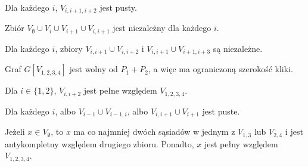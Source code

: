 \documentclass[polish]{beamer}
\begin{document}
\begin{frame}
    \begin{theorem}
        \renewcommand{\qedsymbol}{}
        Dla każdego $i$, $V_{i,i+1,i+2}$ jest pusty.
    \end{theorem}
    \graphSmaller
\end{frame}

\begin{frame}
    \begin{theorem}
        \renewcommand{\qedsymbol}{}
        Zbiór $V_\emptyset \cup V_i \cup V_{i+1} \cup V_{i,i+1}$ jest niezależny dla każdego $i$.
    \end{theorem}
    \graphSmaller
\end{frame}

\begin{frame}
    \begin{theorem}
        \renewcommand{\qedsymbol}{}
        Dla każdego $i$, zbiory $V_{i,i+1} \cup V_{i,i+2}$ i $V_{i,i+1} \cup V_{i+1,i+3}$ są niezależne.
    \end{theorem}
    \graphSmaller
\end{frame}

\begin{frame}
    \begin{theorem}
        \renewcommand{\qedsymbol}{}
        Graf $G[V_{1,2,3,4}]$ jest wolny od $P_1 + P_2$, a więc ma ograniczoną szerokość kliki.
        \end{theorem}
    \graphSmaller
\end{frame}

\begin{frame}
    \begin{theorem}
        \renewcommand{\qedsymbol}{}
        Dla $i \in \{1,2\}$, $V_{i,i+2}$ jest pełne względem $V_{1,2,3,4}$.
    \end{theorem}
    \graphSmaller
\end{frame}

\begin{frame}
    \begin{theorem}
        \renewcommand{\qedsymbol}{}
        Dla każdego $i$, albo $V_{i-1} \cup V_{i-1,i}$, albo $V_{i,i+1} \cup V_{i+1}$ jest puste.
    \end{theorem}
    \graphSmaller
\end{frame}

\begin{frame}
    \begin{theorem}
        \renewcommand{\qedsymbol}{}
        Jeżeli $x \in V_\emptyset$, to $x$ ma co najmniej dwóch sąsiadów w jednym z $V_{1,3}$ lub $V_{2,4}$ i jest antykompletny względem drugiego zbioru. Ponadto, $x$ jest pełny względem $V_{1,2,3,4}$.
    \end{theorem}
    \graphSmaller
\end{frame}
\end{document}

